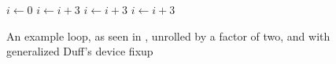 \begin{figure}[H]
	\begin{algorithmic}
		\State $i \gets 0$
				\State {}
				\State $i \gets i + 3$
				\State {}
				\State $i \gets i + 3$
			\EndWhile
		\EndIf
				\State {}
				\State $i \gets i + 3$
			\EndCase
		\EndSwitch
	\end{algorithmic}
	\caption{An example loop, as seen in , unrolled by a factor of two, and with generalized Duff's device fixup}\label{fig:impl:fixup:duff:fixup-firm-comp}
\end{figure}